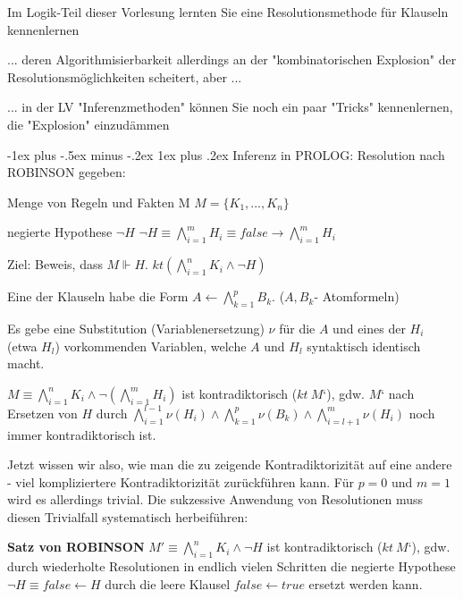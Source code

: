 \documentclass[a4paper]{article}
\makeatletter
\renewcommand{\note}[2]{\begin{noteBox} \textbf{#1} #2 \end{noteBox}}
\renewcommand{\subsubsection}{\@startsection{subsubsection}{3}{0mm}%
                {-1ex plus -.5ex minus -.2ex}%
                {1ex plus .2ex}%
                {\normalfont\small\bfseries}}
\makeatother
\begin{document}
\begin{multicols}{3}
  Im Logik-Teil dieser Vorlesung lernten Sie eine Resolutionsmethode für Klauseln kennenlernen
  \begin{itemize*}
    \item ... deren Algorithmisierbarkeit allerdings an der "kombinatorischen Explosion" der Resolutionsmöglichkeiten scheitert, aber ...
    \item ... in der LV "Inferenzmethoden" können Sie noch ein paar "Tricks" kennenlernen, die "Explosion" einzudämmen
  \end{itemize*}


  \subsubsection{Inferenz in PROLOG: Resolution nach ROBINSON}
  gegeben:
  \begin{itemize*}
    \item Menge von Regeln und Fakten M $M=\{K_1,...,K_n\}$
    \item negierte Hypothese $\lnot H$ $\lnot H\equiv \bigwedge_{i=1}^m H_i \equiv false \rightarrow \bigwedge_{i=1}^m H_i$
  \end{itemize*}

  Ziel: Beweis, dass $M \Vdash H$. $kt(\bigwedge_{i=1}^n K_i \wedge \lnot H)$

  Eine der Klauseln habe die Form $A\leftarrow \bigwedge_{k=1}^p B_k$. ($A,B_k$- Atomformeln)

  Es gebe eine Substitution (Variablenersetzung) $\nu$ für die $A$ und eines der $H_i$ (etwa $H_l$) vorkommenden Variablen, welche $A$ und $H_l$ syntaktisch identisch macht.

  $M\equiv \bigwedge_{i=1}^n K_i\wedge \lnot(\bigwedge_{i=1}^m H_i)$ ist kontradiktorisch ($kt\ M‘$), gdw. $M‘$ nach Ersetzen von $H$ durch $\bigwedge_{i=1}^{l-1}\nu(H_i)\wedge\bigwedge_{k=1}^p\nu(B_k)\wedge\bigwedge_{i=l+1}^m \nu(H_i)$ noch immer kontradiktorisch ist.

  Jetzt wissen wir also, wie man die zu zeigende Kontradiktorizität auf eine andere - viel kompliziertere Kontradiktorizität zurückführen kann.
  Für $p=0$ und $m=1$ wird es allerdings trivial.
  Die sukzessive Anwendung von Resolutionen muss diesen Trivialfall systematisch herbeiführen:

  \note{Satz von ROBINSON}{$M'\equiv\bigwedge_{i=1}^n K_i\wedge \lnot H$ ist kontradiktorisch ($kt\ M‘$), gdw. durch wiederholte Resolutionen in endlich vielen Schritten die negierte Hypothese $\lnot H\equiv false \leftarrow H$ durch die leere Klausel $false\leftarrow true$ ersetzt werden kann.}


\end{multicols}
\end{document}
